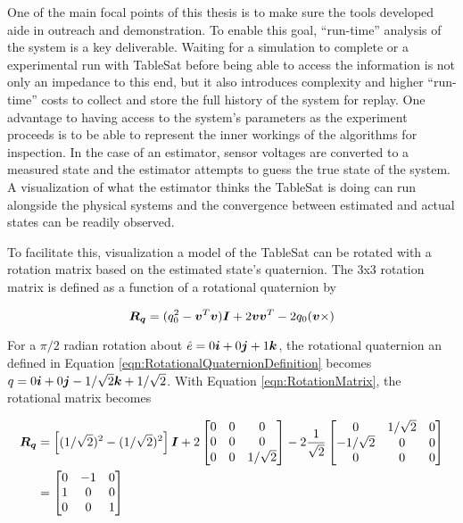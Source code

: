 One of the main focal points of this thesis is to make sure the tools developed aide in outreach and demonstration.  To enable this goal, ``run-time'' analysis of the system is a key deliverable.  Waiting for a simulation to complete or a experimental run with TableSat before being able to access the information is not only an impedance to this end, but it also introduces complexity and higher ``run-time'' costs to collect and store the full history of the system for replay.  One advantage to having access to the system's parameters as the experiment proceeds is to be able to represent the inner workings of the algorithms for inspection.  In the case of an estimator, sensor voltages are converted to a measured state and the estimator attempts to guess the true state of the system.  A visualization of what the estimator thinks the TableSat is doing can run alongside the physical systems and the convergence between estimated and actual states can be readily observed.

To facilitate this, visualization a model of the TableSat can be rotated with a rotation matrix based on the estimated state's quaternion.  The 3x3 rotation matrix is defined as a function of a rotational quaternion by

\begin{equation}
  \boldsymbol{R_q} = (q_0^2 - \boldsymbol{v}^T \boldsymbol{v}) \boldsymbol{I} + 2 \boldsymbol{v} \boldsymbol{v}^T - 2 q_0 (\boldsymbol{v} \times)
  \label{eqn:RotationMatrix}
\end{equation}

For a $\pi/2$ radian rotation about $\hat{e} = 0\boldsymbol{i}+0\boldsymbol{j}+1\boldsymbol{k}$, the rotational quaternion an defined in Equation \ref{eqn:RotationalQuaternionDefinition} becomes $q = 0\boldsymbol{i}+0\boldsymbol{j}-1/\sqrt{2}\boldsymbol{k}+1/\sqrt{2}$.  With Equation \ref{eqn:RotationMatrix}, the rotational matrix becomes

\begin{equation}
  \begin{aligned}
    \boldsymbol{R_q} & = \left[ (1/\sqrt{2})^2 - (1/\sqrt{2})^2 \right] \boldsymbol{I} + 2 \begin{bmatrix} 0 & 0 & 0 \\ 0 & 0 & 0 \\ 0 & 0 & 1/\sqrt{2} \end{bmatrix} - 2 \frac{1}{\sqrt{2}} \begin{bmatrix} 0 & 1/\sqrt{2} & 0 \\ -1/\sqrt{2} & 0 & 0 \\ 0 & 0 & 0 \\ \end{bmatrix} \\
      & = \begin{bmatrix} 0 & -1 & 0 \\ 1 & 0 & 0 \\ 0 & 0 & 1 \\\end{bmatrix}
  \end{aligned}
\end{equation}

